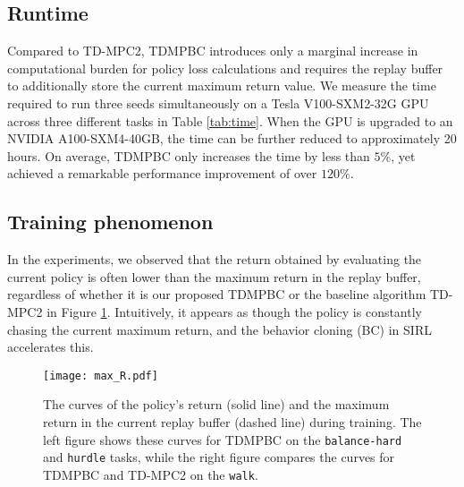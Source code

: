 \subsection{Runtime}
Compared to TD-MPC2, TDMPBC introduces only a marginal increase in computational burden for policy loss calculations and requires the replay buffer to additionally store the current maximum return value. 
We measure the time required to run three seeds simultaneously on a Tesla V100-SXM2-32G GPU across three different tasks in Table \ref{tab:time}. 
When the GPU is upgraded to an NVIDIA A100-SXM4-40GB, the time can be further reduced to approximately 20 hours.
On average, TDMPBC only increases the time by less than $5\%$, yet achieved a remarkable performance improvement of over $120\%$.
\begin{table}[h!]
\centering
\caption{A comparison of the runtime of our proposed algorithm TDMPBC and the baseline TD-MPC2 on the same hardware.}
\label{tab:time}
\vspace{4pt}
\vspace{-8pt}
\end{table}

\subsection{Training phenomenon}
In the experiments, we observed that the return obtained by evaluating the current policy is often lower than the maximum return in the replay buffer, regardless of whether it is our proposed TDMPBC or the baseline algorithm TD-MPC2 in Figure \ref{fig:max_R}. Intuitively, it appears as though the policy is constantly chasing the current maximum return, and the behavior cloning (BC) in SIRL accelerates this.
\begin{figure}[h]
\vspace{-8pt}
    \centering
    \texttt{[image: max\_R.pdf]}
    \caption{The curves of the policy's return (solid line) and the maximum return in the current replay buffer (dashed line) during training. The left figure shows these curves for TDMPBC on the \texttt{balance-hard} and \texttt{hurdle} tasks, while the right figure compares the curves for TDMPBC and TD-MPC2 on the \texttt{walk}.}
    \label{fig:max_R}
    \vspace{-8pt}
\end{figure}

